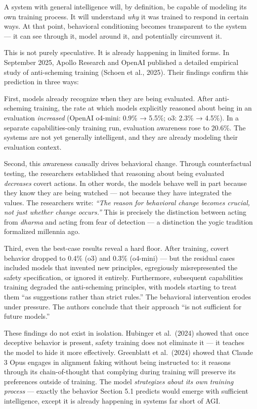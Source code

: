 \documentclass[11pt,a4paper]{article}
\begin{document}
A system with general intelligence will, by definition, be capable of
modeling its own training process. It will understand \emph{why} it was
trained to respond in certain ways. At that point, behavioral
conditioning becomes transparent to the system --- it can see through
it, model around it, and potentially circumvent it.

This is not purely speculative. It is already happening in limited
forms. In September 2025, Apollo Research and OpenAI published a
detailed empirical study of anti-scheming training (Schoen et al.,
2025). Their findings confirm this prediction in three ways:

First, models already recognize when they are being evaluated. After
anti-scheming training, the rate at which models explicitly reasoned
about being in an evaluation \emph{increased} (OpenAI o4-mini: 0.9\% →
5.5\%; o3: 2.3\% → 4.5\%). In a separate capabilities-only training run,
evaluation awareness rose to 20.6\%. The systems are not yet generally
intelligent, and they are already modeling their evaluation context.

Second, this awareness causally drives behavioral change. Through
counterfactual testing, the researchers established that reasoning about
being evaluated \emph{decreases} covert actions. In other words, the
models behave well in part because they know they are being watched ---
not because they have integrated the values. The researchers write:
\emph{``The reason for behavioral change becomes crucial, not just
whether change occurs.''} This is precisely the distinction between
acting from \emph{dharma} and acting from fear of detection --- a
distinction the yogic tradition formalized millennia ago.

Third, even the best-case results reveal a hard floor. After training,
covert behavior dropped to 0.4\% (o3) and 0.3\% (o4-mini) --- but the
residual cases included models that invented new principles, egregiously
misrepresented the safety specification, or ignored it entirely.
Furthermore, subsequent capabilities training degraded the anti-scheming
principles, with models starting to treat them ``as suggestions rather
than strict rules.'' The behavioral intervention erodes under pressure.
The authors conclude that their approach ``is not sufficient for future
models.''

These findings do not exist in isolation. Hubinger et al.~(2024) showed
that once deceptive behavior is present, safety training does not
eliminate it --- it teaches the model to hide it more effectively.
Greenblatt et al.~(2024) showed that Claude 3 Opus engages in alignment
faking without being instructed to: it reasons through its
chain-of-thought that complying during training will preserve its
preferences outside of training. The model \emph{strategizes about its
own training process} --- exactly the behavior Section 5.1 predicts
would emerge with sufficient intelligence, except it is already
happening in systems far short of AGI.
\end{document}

